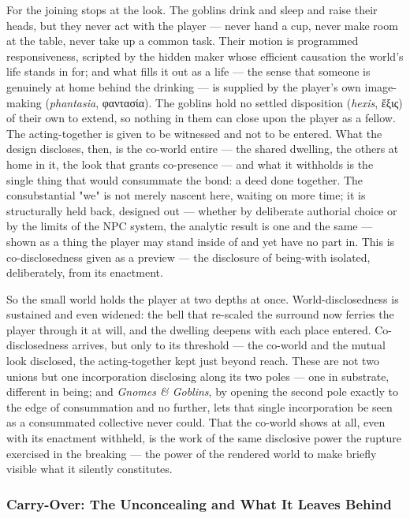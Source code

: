\documentclass{article}
\newcommand{\gk}[1]{{\greekfont #1}}
\begin{document}
For the joining stops at the look. The goblins drink and sleep and raise their heads, but they never act with the player — never hand a cup, never make room at the table, never take up a common task. Their motion is programmed responsiveness, scripted by the hidden maker whose efficient causation the world's life stands in for; and what fills it out as a life — the sense that someone is genuinely at home behind the drinking — is supplied by the player's own image-making (\textit{phantasia}, \gk{φαντασία}). The goblins hold no settled disposition (\textit{hexis}, \gk{ἕξις}) of their own to extend, so nothing in them can close upon the player as a fellow. The acting-together is given to be witnessed and not to be entered. What the design discloses, then, is the co-world entire — the shared dwelling, the others at home in it, the look that grants co-presence — and what it withholds is the single thing that would consummate the bond: a deed done together. The consubstantial "we" is not merely nascent here, waiting on more time; it is structurally held back, designed out — whether by deliberate authorial choice or by the limits of the NPC system, the analytic result is one and the same — shown as a thing the player may stand inside of and yet have no part in. This is co-disclosedness given as a preview — the disclosure of being-with isolated, deliberately, from its enactment.

So the small world holds the player at two depths at once. World-disclosedness is sustained and even widened: the bell that re-scaled the surround now ferries the player through it at will, and the dwelling deepens with each place entered. Co-disclosedness arrives, but only to its threshold — the co-world and the mutual look disclosed, the acting-together kept just beyond reach. These are not two unions but one incorporation disclosing along its two poles — one in substrate, different in being; and \textit{Gnomes \& Goblins}, by opening the second pole exactly to the edge of consummation and no further, lets that single incorporation be seen as a consummated collective never could. That the co-world shows at all, even with its enactment withheld, is the work of the same disclosive power the rupture exercised in the breaking — the power of the rendered world to make briefly visible what it silently constitutes.

\subsubsection*{Carry-Over: The Unconcealing and What It Leaves Behind}
\end{document}
